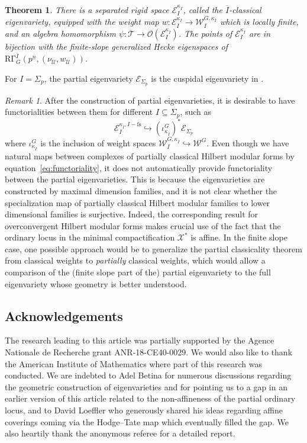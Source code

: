 \documentclass[11pt]{amsart}
\theoremstyle{definition} %
\theoremstyle{plain} %
\newtheorem{theorem}[definition]{Theorem}
\theoremstyle{remark} %
\newtheorem{remark}[definition]{Remark}
\newcommand{\cE}{{\mathcal E}}
\newcommand{\cO}{{\mathcal O}}
\newcommand{\cT}{{\mathcal T}}
\newcommand{\cU}{{\mathcal U}}
\newcommand{\cW}{{\mathcal W}}
\newcommand{\cX}{{\mathcal X}}
\newcommand{\RG}{\mathrm{R\Gamma}}
\begin{document}
\begin{theorem} \label{thm:main}
There is a separated rigid space $\cE_{I}^{\kappa_{\overline{I}}}$, called the $\overline{I}$-classical eigenvariety, equipped with the weight map $w\colon \cE_{I}^{\kappa_{\overline{I}}} \rightarrow \cW_{I}^{G,\kappa_{\overline{I}}}$ which is locally finite, and an algebra homomorphism $\psi\colon \cT \rightarrow \cO(\cE_{I}^{\kappa_{\overline{I}}} )$.
The points of $\cE_{I}^{\kappa_{\overline{I}}}$ are in bijection with the finite-slope generalized Hecke eigenspaces of $\RG_G^{\overline{I}}(p^{\underline{n}},(\nu_\cU,w_\cU))$.
\end{theorem}

For $I=\Sigma_p$, the partial eigenvariety $\cE_{\Sigma_p}$ is the cuspidal eigenvariety in \cite{AIP16}.


\begin{remark} \label{rmk:nonsurj}
After the construction of partial eigenvarieties, it is desirable to have functorialities between them for different $I\subseteq \Sigma_p$, such as
\[
\cE_I^{\kappa_{\overline{I}},I-\mathrm{fs}} \hookrightarrow 
 (\iota^G_{\kappa_{\overline{I}}})^\ast\cE_{\Sigma_p}
\]
where $\iota^G_{\kappa_{\overline{I}}}$ is the inclusion of weight spaces $\cW_{I}^{G,\kappa_{\overline{I}}} \hookrightarrow \cW^G$.
Even though we have natural maps between complexes of partially classical Hilbert modular forms by equation~\eqref{eq:functoriality}, it does not automatically provide functoriality between the partial eigenvarieties.
This is because the eigenvarieties are constructed by maximal dimension families, and it is not clear whether the specialization map of partially classical Hilbert modular families to lower dimensional families is surjective. Indeed, the corresponding result for overconvergent Hilbert modular forms makes crucial use of the fact that the ordinary locus in the minimal compactification $\cX^\ast$ is affine. In the finite slope case,  one possible approach would be to generalize the partial classicality theorem \cite{Hsu_partial} from classical weights to {\it partially} classical weights, which would  allow a comparison of the (finite slope part of the) partial eigenvariety to the full eigenvariety whose geometry is better understood. 
\end{remark}


\bigskip 
\subsection*{Acknowledgements} The research leading to this article was partially supported  by the Agence Nationale de Recherche grant ANR-18-CE40-0029. We would also like to thank the American Institute of Mathematics where part of this research was conducted. We are indebted to Adel Betina for numerous discussions regarding the geometric construction of eigenvarieties and for pointing us to a gap in an earlier version of this article related to the non-affineness of the partial ordinary locus, 
and to David Loeffler who generously shared his ideas regarding
affine coverings coming via the Hodge--Tate map which eventually filled the gap. We also heartily thank the anonymous referee for a detailed report. 
\end{document}
